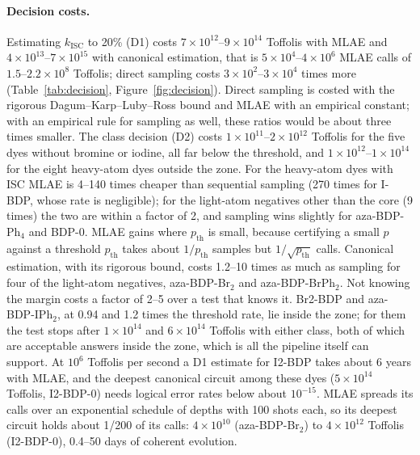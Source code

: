 \documentclass[journal=jctcce,manuscript=article]{achemso}
\newcommand{\kisc}{k_\mathrm{ISC}}
\begin{document}
\paragraph{Decision costs.} Estimating $\kisc$ to 20\% (D1) costs $7\times10^{12}$--$9\times10^{14}$ Toffolis
with MLAE and $4\times10^{13}$--$7\times10^{15}$ with canonical estimation, that is $5\times10^{4}$--$4\times10^{6}$
MLAE calls of $1.5$--$2.2\times10^{8}$ Toffolis; direct sampling costs $3\times10^{2}$--$3\times10^{4}$ times more
(Table~\ref{tab:decision}, Figure~\ref{fig:decision}). Direct sampling is costed with the rigorous Dagum--Karp--Luby--Ross bound and MLAE with an empirical constant; with an
empirical rule for sampling as well, these ratios would be about three times smaller. The class decision (D2) costs
$1\times10^{11}$--$2\times10^{12}$ Toffolis for the five dyes without bromine or iodine, all far below the
threshold, and $1\times10^{12}$--$1\times10^{14}$ for the eight heavy-atom dyes outside the zone. For the heavy-atom
dyes with ISC MLAE is 4--140 times cheaper than sequential sampling (270 times for I-BDP, whose rate is negligible); for the light-atom negatives other than the core
(9 times) the two are within a factor of 2, and sampling wins slightly for aza-BDP-Ph$_4$ and BDP-0. MLAE gains
where $p_\mathrm{th}$ is small, because certifying a small $p$ against a
threshold $p_\mathrm{th}$ takes about $1/p_\mathrm{th}$ samples but $1/\sqrt{p_\mathrm{th}}$ calls. Canonical estimation, with its rigorous bound, costs 1.2--10 times as much as sampling for
four of the light-atom negatives, aza-BDP-Br$_2$ and aza-BDP-BrPh$_2$. Not knowing the margin costs a factor of
2--5 over a test that knows it. Br2-BDP and aza-BDP-IPh$_2$, at 0.94 and 1.2 times the threshold rate, lie inside the
zone; for them the test stops after $1\times10^{14}$ and $6\times10^{14}$ Toffolis with either class, both of which
are acceptable answers inside the zone, which is all the pipeline itself can support. At $10^{6}$ Toffolis per
second a D1 estimate for I2-BDP takes about 6 years with MLAE, and the deepest canonical circuit among these dyes
($5\times10^{14}$ Toffolis, I2-BDP-0) needs logical error rates below about $10^{-15}$. MLAE spreads its calls over
an exponential schedule of depths with 100 shots each, so its deepest circuit holds about 1/200 of its calls:
$4\times10^{10}$ (aza-BDP-Br$_2$) to $4\times10^{12}$ Toffolis (I2-BDP-0), 0.4--50 days of coherent evolution.
\end{document}
